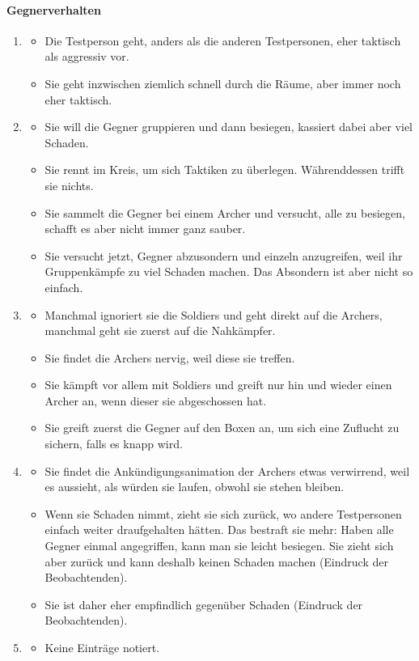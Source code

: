 \documentclass[../Main.tex]{subfiles}
\begin{document}
\paragraph{Gegnerverhalten}
\begin{enumerate}[label=\textbf{B\arabic*}, leftmargin=1.5cm, itemsep=0.8em]
\item
\begin{itemize}[nosep]
\item Die Testperson geht, anders als die anderen Testpersonen, eher taktisch als aggressiv vor.
\item Sie geht inzwischen ziemlich schnell durch die Räume, aber immer noch eher taktisch.
\end{itemize}
\item
\begin{itemize}[nosep]
\item Sie will die Gegner gruppieren und dann besiegen, kassiert dabei aber viel Schaden.
\item Sie rennt im Kreis, um sich Taktiken zu überlegen. Währenddessen trifft sie nichts.
\item Sie sammelt die Gegner bei einem Archer und versucht, alle zu besiegen, schafft es aber nicht immer ganz sauber.
\item Sie versucht jetzt, Gegner abzusondern und einzeln anzugreifen, weil ihr Gruppenkämpfe zu viel Schaden machen. Das Absondern ist aber nicht so einfach.
\end{itemize}
\item
\begin{itemize}[nosep]
\item Manchmal ignoriert sie die Soldiers und geht direkt auf die Archers, manchmal geht sie zuerst auf die Nahkämpfer.
\item Sie findet die Archers nervig, weil diese sie treffen.
\item Sie kämpft vor allem mit Soldiers und greift nur hin und wieder einen Archer an, wenn dieser sie abgeschossen hat.
\item Sie greift zuerst die Gegner auf den Boxen an, um sich eine Zuflucht zu sichern, falls es knapp wird.
\end{itemize}
\item
\begin{itemize}[nosep]
\item Sie findet die Ankündigungsanimation der Archers etwas verwirrend, weil es aussieht, als würden sie laufen, obwohl sie stehen bleiben.
\item Wenn sie Schaden nimmt, zieht sie sich zurück, wo andere Testpersonen einfach weiter draufgehalten hätten. Das bestraft sie mehr: Haben alle Gegner einmal angegriffen, kann man sie leicht besiegen. Sie zieht sich aber zurück und kann deshalb keinen Schaden machen (Eindruck der Beobachtenden).
\item Sie ist daher eher empfindlich gegenüber Schaden (Eindruck der Beobachtenden).
\end{itemize}
\item
\begin{itemize}[nosep]
\item Keine Einträge notiert.
\end{itemize}
\end{enumerate}
\end{document}
